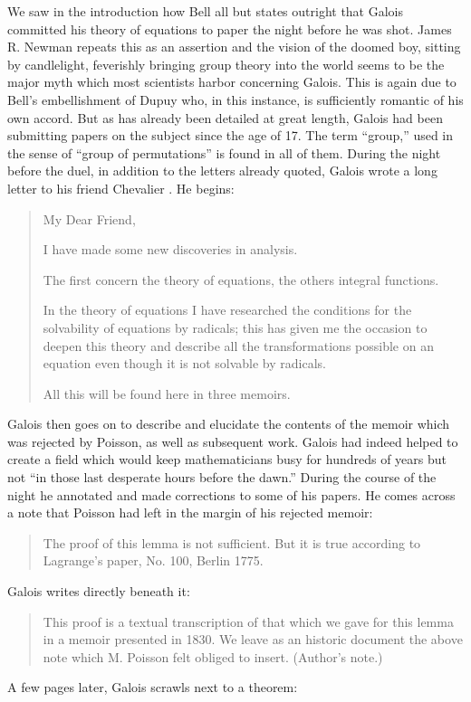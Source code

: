 \documentclass[12pt]{article}
\begin{document}
We saw in the introduction how Bell all but states outright that Galois committed his theory of equations to paper the night before he was shot. James R. Newman repeats this as an assertion and the vision of the doomed boy, sitting by candlelight, feverishly bringing group theory into the world seems to be the major myth which most scientists harbor concerning Galois. This is again due to Bell's embellishment of Dupuy who, in this instance, is sufficiently romantic of his own accord. But as has already been detailed at great length, Galois had been submitting papers on the subject since the age of 17. The term ``group,'' used in the sense of ``group of permutations'' is found in all of them. During the night before the duel, in addition to the letters already quoted, Galois wrote a long letter to his friend Chevalier \cite{94,95,96,97}. He begins:

\begin{quotation}
\noindent
My Dear Friend,
\medskip

I have made some new discoveries in analysis. 

The first concern the theory of equations, the others integral functions. 

In the theory of equations I have researched the conditions for the solvability of equations by radicals; this has given me the occasion to deepen this theory and describe all the transformations possible on an equation even though it is not solvable by radicals. 

All this will be found here in three memoirs.
\end{quotation}

Galois then goes on to describe and elucidate the contents of the memoir which was rejected by Poisson, as well as subsequent work. Galois had indeed helped to create a field which would keep mathematicians busy for hundreds of years but not ``in those last desperate hours before the dawn.'' During the course of the night he annotated and made corrections to some of his papers. He comes across a note that Poisson had left in the margin of his rejected memoir:

\begin{quote}
The proof of this lemma is not sufficient. But it is true according to Lagrange's paper, No. 100, Berlin 1775.
\end{quote}
Galois writes directly beneath it:

\begin{quote}
This proof is a textual transcription of that which we gave for this lemma in a memoir presented in 1830. We leave as an historic document the above note which M. Poisson felt obliged to insert. (Author's note.)
\end{quote}
A few pages later, Galois scrawls next to a theorem:
\end{document}
